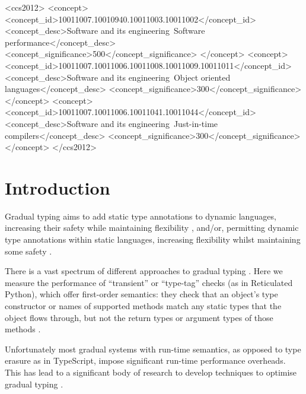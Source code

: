 \documentclass[sigplan,screen]{acmart}
\begin{document}
\begin{CCSXML}
<ccs2012>
<concept>
<concept_id>10011007.10010940.10011003.10011002</concept_id>
<concept_desc>Software and its engineering~Software performance</concept_desc>
<concept_significance>500</concept_significance>
</concept>
<concept>
<concept_id>10011007.10011006.10011008.10011009.10011011</concept_id>
<concept_desc>Software and its engineering~Object oriented languages</concept_desc>
<concept_significance>300</concept_significance>
</concept>
<concept>
<concept_id>10011007.10011006.10011041.10011044</concept_id>
<concept_desc>Software and its engineering~Just-in-time compilers</concept_desc>
<concept_significance>300</concept_significance>
</concept>
</ccs2012>
\end{CCSXML}


\maketitle


\section{Introduction}
Gradual typing aims to add static type annotations to dynamic languages, increasing their safety while maintaining flexibility \citep{GiladPluggable2004,Siek2006,XXXSiek2015}, and/or, permitting dynamic type annotations within static languages, increasing flexibility whilst maintaining some safety \citep{AbadiTOPLAS1991}.

There is a vast spectrum of different approaches to gradual typing
\cite{kafka18,bensurvey18icfp}. Here we measure the performance of
``transient'' or ``type-tag'' checks (as in Reticulated Python), which
offer first-order semantics: they check that an object's type
constructor or names of supported methods match any static types that
the object flows through, but not the return types or argument types of those methods \cite{Siek2007,Bloom2009,concrete15,reticPython2014,Greenman2018}.

Unfortunately most gradual systems with run-time semantics, as opposed to type erasure as in TypeScript, impose significant run-time performance overheads. This has lead to a significant body of research to develop techniques to optimise gradual typing \citep{Vitousek2017,Muehlboeck2017,Bauman2017,Richards2017,Greenman2018}.
\end{document}
